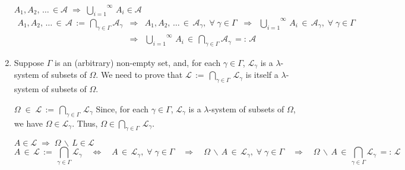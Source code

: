 \begin{enumerate}
	\vskip 0.1cm
	\noindent
	\underline{$A_{1}, A_{2},\,\ldots\, \in \mathcal{A} \;\Longrightarrow\; \overset{\infty}{\underset{i=1}{\bigcup}}\,A_{i} \in \mathcal{A}$}
	\begin{eqnarray*}
	A_{1},A_{2},\,\ldots \,\in\, \mathcal{A} \, := \, \bigcap_{\gamma\in\Gamma}\mathcal{A}_{\gamma}
	&\Longrightarrow& A_{1},A_{2},\,\ldots \, \in \, \mathcal{A}_{\gamma},\;\forall\;\gamma \in \Gamma
	\;\;\Longrightarrow\;\; \overset{\infty}{\underset{i=1}{\bigcup}}\,A_{i} \, \in \, \mathcal{A}_{\gamma},\;\forall\;\gamma \in \Gamma
	\\
	&\Longrightarrow& \overset{\infty}{\underset{i=1}{\bigcup}}\,A_{i} \, \in \, \bigcap_{\gamma\in\Gamma}\mathcal{A}_{\gamma} \, =: \, \mathcal{A}
	\end{eqnarray*}
\item
	Suppose $\Gamma$ is an (arbitrary) non-empty set, and,
	for each $\gamma \in \Gamma$, $\mathcal{L}_{\gamma}$ is a $\lambda$-system of subsets of $\Omega$.
	We need to prove that $\mathcal{L} \, := \, \bigcap_{\gamma\in\Gamma}\,\mathcal{L}_{\gamma}$
	is itself a $\lambda$-system of subsets of $\Omega$.

	\vskip 0.8cm
	\noindent
	\underline{$\Omega \;\in\; \mathcal{L} \,:=\, \underset{\gamma\in\Gamma}{\bigcap}\,\mathcal{L}_{\gamma}$}
	\vskip 0.1cm
	\noindent
	Since, for each $\gamma\in\Gamma$, $\mathcal{L}_{\gamma}$ is a $\lambda$-system of subsets
	of $\Omega$, we have $\Omega \in \mathcal{L}_{\gamma}$.
	Thus, $\Omega \in \underset{\gamma\in\Gamma}{\bigcap}\,\mathcal{L}_{\gamma}$.

	\vskip 0.8cm
	\noindent
	\underline{$A \in \mathcal{L} \;\Longrightarrow\; \Omega\,\backslash\,L \in \mathcal{L}$}
	\begin{equation*}
	A \,\in\, \mathcal{L} \, := \, \bigcap_{\gamma\in\Gamma}\mathcal{L}_{\gamma}
	\quad\Longleftrightarrow\quad A \, \in \, \mathcal{L}_{\gamma},\;\forall\;\gamma \in \Gamma
	\quad\Longrightarrow\quad \Omega\,\backslash\,A \, \in \, \mathcal{L}_{\gamma},\;\forall\;\gamma \in \Gamma
	\quad\Longrightarrow\quad \Omega\,\backslash\,A \, \in \, \bigcap_{\gamma\in\Gamma}\mathcal{L}_{\gamma} \, =: \, \mathcal{L}
	\end{equation*}


\end{enumerate}
